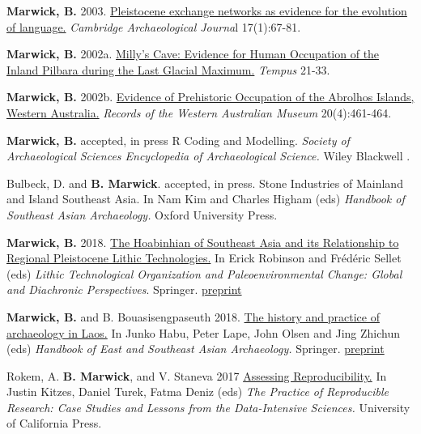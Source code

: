 \documentclass[11pt,article,oneside]{memoir}
\begin{document}
{{{{\ind \textbf{Marwick, B.} 2003. \href{http://faculty.washington.edu/bmarwick/PDFs/Marwick_2003_CAJ.pdf}{Pleistocene exchange networks as evidence for the evolution of language.} \textit{Cambridge Archaeological Journa}l 17(1):67-81.

\ind \textbf{Marwick, B.} 2002a. \href{http://faculty.washington.edu/bmarwick/PDFs/Marwick_2002_Tempus.pdf}{Milly's Cave: Evidence for Human Occupation of the Inland Pilbara during the Last Glacial Maximum.} \textit{Tempus} 21-33.

\ind \textbf{Marwick, B.} 2002b. \href{http://faculty.washington.edu/bmarwick/PDFs/Marwick_2002_RWAM.pdf}{Evidence of Prehistoric Occupation of the Abrolhos Islands, Western Australia.} \textit{Records of the Western Australian Museum} 20(4):461-464.

\bigskip


\ind \textbf{Marwick, B.} accepted, in press R Coding and Modelling. \textit{Society of Archaeological Sciences Encyclopedia of Archaeological Science.} Wiley Blackwell . 

\ind Bulbeck, D. and \textbf{B. Marwick}. accepted, in press. Stone Industries of Mainland and Island Southeast Asia. In Nam Kim and Charles Higham (eds) \textit{Handbook of Southeast Asian Archaeology.} Oxford University Press.

\ind \textbf{Marwick, B.} 2018. \href{https://doi.org/10.1007/978-3-319-64407-3_4}{The Hoabinhian of Southeast Asia and its Relationship to Regional Pleistocene Lithic Technologies.} In Erick Robinson and Frédéric Sellet (eds) \textit{Lithic Technological Organization and Paleoenvironmental Change: Global and Diachronic Perspectives}. Springer. \href{https://doi.org/10.17605/OSF.IO/9PT8G}{preprint}

\ind \textbf{Marwick, B.} and B. Bouasisengpaseuth 2018. \href{https://doi.org/10.1007/978-1-4939-6521-2_8}{The history and practice of archaeology in Laos.} In Junko Habu, Peter Lape, John Olsen and Jing Zhichun (eds) \textit{ Handbook of East and Southeast Asian Archaeology.} Springer. \href{https://dx.doi.org/10.17605/OSF.IO/75ZHC}{preprint}

\ind Rokem, A. \textbf{B. Marwick}, and V. Staneva 2017 \href{https://www.practicereproducibleresearch.org/core-chapters/2-assessment.html}{Assessing Reproducibility.} In Justin Kitzes, Daniel Turek, Fatma Deniz (eds) \textit{The Practice of Reproducible Research: Case Studies and Lessons from the Data-Intensive Sciences.} University of California Press.

}}}}
\end{document}
